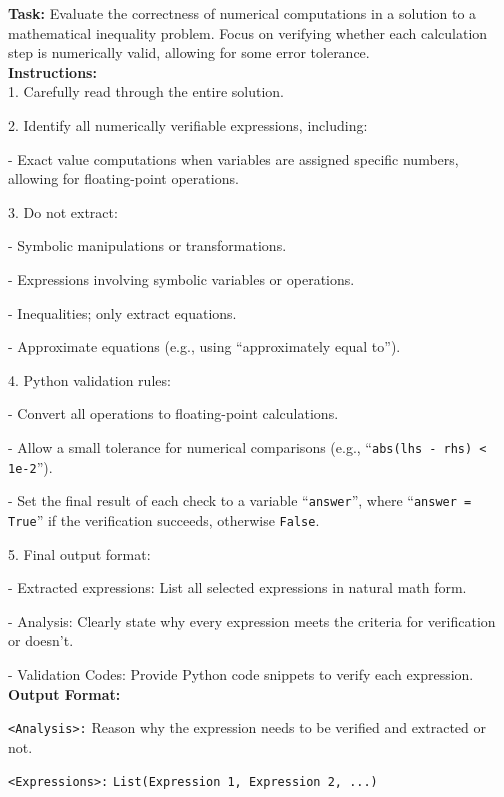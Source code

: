 \begin{textcolorbox}
\textbf{Task:} Evaluate the correctness of numerical computations in a solution to a mathematical inequality problem. Focus on verifying whether each calculation step is numerically valid, allowing for some error tolerance.\\

\textbf{Instructions:}\\
1. Carefully read through the entire solution.

2. Identify all numerically verifiable expressions, including:

\quad - Exact value computations when variables are assigned specific numbers, allowing for floating-point operations.

3. Do not extract:

\quad - Symbolic manipulations or transformations.

\quad - Expressions involving symbolic variables or operations.

\quad - Inequalities; only extract equations.

\quad - Approximate equations (e.g., using ``approximately equal to'').

4. Python validation rules:

\quad - Convert all operations to floating-point calculations.

\quad - Allow a small tolerance for numerical comparisons (e.g., ``\texttt{abs(lhs - rhs) < 1e-2}'').

\quad - Set the final result of each check to a variable ``\texttt{answer}'', where ``\texttt{answer = True}'' if the verification succeeds, otherwise \texttt{False}.


5. Final output format:

\quad - Extracted expressions: List all selected expressions in natural math form.

\quad - Analysis: Clearly state why every expression meets the criteria for verification or doesn't.

\quad - Validation Codes: Provide Python code snippets to verify each expression. 
\\

\textbf{Output Format:}

\texttt{<Analysis>:}
Reason why the expression needs to be verified and extracted or not. 

\texttt{<Expressions>:}
\texttt{List(Expression 1, Expression 2, ...)} 


\end{textcolorbox}
